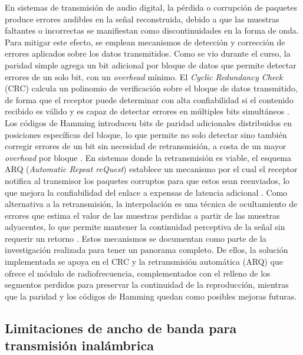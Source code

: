 En sistemas de transmisión de audio digital, la pérdida o corrupción de paquetes produce errores audibles en la señal reconstruida, debido a que las muestras faltantes o incorrectas se manifiestan como discontinuidades en la forma de onda.
Para mitigar este efecto, se emplean mecanismos de detección y corrección de errores aplicados sobre los datos transmitidos.
Como se vio durante el curso, la paridad simple agrega un bit adicional por bloque de datos que permite detectar errores de un solo bit, con un \textit{overhead} mínimo.
El \textit{Cyclic Redundancy Check} (CRC) calcula un polinomio de verificación sobre el bloque de datos transmitido, de forma que el receptor puede determinar con alta confiabilidad si el contenido recibido es válido y es capaz de detectar errores en múltiples bits simultáneos \cite{pohlmann2005, tanenbaum2011}.
Los códigos de Hamming introducen bits de paridad adicionales distribuidos en posiciones específicas del bloque, lo que permite no solo detectar sino también corregir errores de un bit sin necesidad de retransmisión, a costa de un mayor \textit{overhead} por bloque \cite{tarres_cabrera_codificacion, haykin2007}.
En sistemas donde la retransmisión es viable, el esquema ARQ (\textit{Automatic Repeat reQuest}) establece un mecanismo por el cual el receptor notifica al transmisor los paquetes corruptos para que estos sean reenviados, lo que mejora la confiabilidad del enlace a expensas de latencia adicional \cite{tanenbaum2011, haykin2007}.
Como alternativa a la retransmisión, la interpolación es una técnica de ocultamiento de errores que estima el valor de las muestras perdidas a partir de las muestras adyacentes, lo que permite mantener la continuidad perceptiva de la señal sin requerir un retorno \cite{tanenbaum2011}.
Estos mecanismos se documentan como parte de la investigación realizada para tener un panorama completo.
De ellos, la solución implementada se apoya en el CRC y la retransmisión automática (ARQ) que ofrece el módulo de radiofrecuencia, complementados con el relleno de los segmentos perdidos para preservar la continuidad de la reproducción, mientras que la paridad y los códigos de Hamming quedan como posibles mejoras futuras.

\subsection{Limitaciones de ancho de banda para transmisión inalámbrica}

